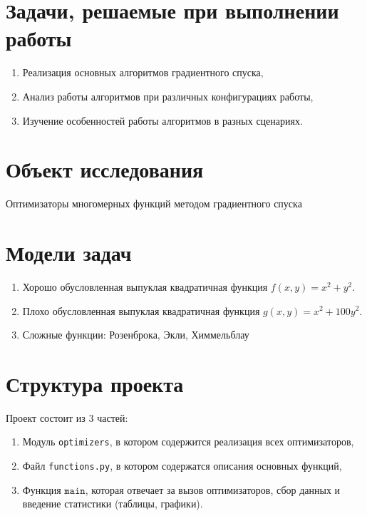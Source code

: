 \documentclass[12pt]{article}
\def\t{\texttt}
\begin{document}
\section{Задачи, решаемые при выполнении работы}
\begin{enumerate}
    \item Реализация основных алгоритмов градиентного спуска,
    \item Анализ работы алгоритмов при различных конфигурациях работы,
    \item Изучение особенностей работы алгоритмов в разных сценариях.
\end{enumerate}

\section{Объект исследования}
Оптимизаторы многомерных функций методом градиентного спуска

\section{Модели задач}

\begin{enumerate}
    \item Хорошо обусловленная выпуклая квадратичная функция $f (x, y) = x^2 + y^2$.
    \item Плохо обусловленная выпуклая квадратичная функция $g(x, y) = x^2 + 100y^2$.
    \item Сложные функции: Розенброка, Экли, Химмельблау
\end{enumerate}

\section{Структура проекта}
Проект состоит из 3 частей:
\begin{enumerate}
    \item Модуль \t{optimizers}, в котором содержится реализация всех оптимизаторов,
    \item Файл \t{functions.py}, в котором содержатся описания основных функций,
    \item Функция $\t{main}$, которая отвечает за вызов оптимизаторов, сбор данных и введение статистики (таблицы, графики).
\end{enumerate}
\end{document}
